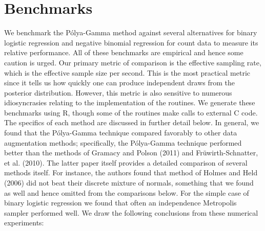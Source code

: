 \documentclass{article}
\newcommand{\Polya}{P\'{o}lya}
\begin{document}
\section{Benchmarks}

We benchmark the \Polya-Gamma method against several alternatives for binary
logistic regression and negative binomial regression for count data to measure
its relative performance.  All of these benchmarks are empirical and hence some
caution is urged.  Our primary metric of comparison is the effective sampling
rate, which is the effective sample size per second.  This is the most practical
metric since it tells us how quickly one can produce independent draws from the
posterior distribution.  However, this metric is also sensitive to numerous
idiosyncrasies relating to the implementation of the routines.  We generate
these benchmarks using R, though some of the routines make calls to external C
code.  The specifics of each method are discussed in further detail below.  In
general, we found that the \Polya-Gamma technique compared favorably to other
data augmentation methods; specifically, the \Polya-Gamma technique performed
better than the methods of Gramacy and Polson (2011) and Fr\"{u}wirth-Schnatter,
et al. (2010).  The latter paper itself provides a detailed comparison of
several methods itself.  For instance, the authors found that method of Holmes
and Held (2006) did not beat their discrete mixture of normals, something that
we found as well and hence omitted from the comparisons below.  For the simple
case of binary logistic regression we found that often an independence
Metropolis sampler performed well.  We draw the following conclusions from these
numerical experiments:
\end{document}
